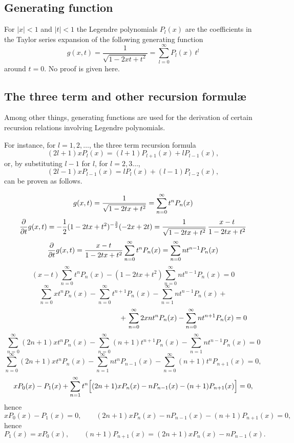 \subsection{Generating function}

For
$\vert x\vert<1$ and
$\vert t\vert<1$ the
Legendre polynomials $P_l(x)$ are the coefficients in the Taylor series expansion of the following generating function
\begin{equation}
g(x,t) =\frac{1}{\sqrt{1-2xt+t^2}}=\sum_{l=0}^\infty P_l(x)\, t^l
\end{equation}
 around $t=0$.
No proof is given here.

\subsection{The three term and other recursion formul\ae}

Among other things, generating functions are used for the derivation of certain recursion relations involving Legendre polynomials.

For instance, for $l=1,2,\ldots$, the   three term recursion formula
\begin{equation}
(2l+1)x P_l(x) = (l+1) P_{l+1}(x)+lP_{l-1}(x) ,
\end{equation}
or, by substituting $l-1$ for $l$,  for $l=2,3\ldots$,
\begin{equation}
(2l-1)x P_{l-1}(x) = l P_{l}(x)+(l-1)P_{l-2}(x),
\end{equation}
can be proven as follows.

{\color{OliveGreen}
\bproof

$$
   g(x,t)={1\over\sqrt{1-2tx+t^2}}=\sum_{n=0}^\infty t^nP_n(x)
$$
$$
   {\partial\over\partial t}g(x,t)=-{1\over 2}(1-2tx+t^2)^{-{3\over 2}}
   (-2x+2t)={1\over\sqrt{1-2tx+t^2}}\,{x-t\over1-2tx+t^2}
$$
$$
   {\partial\over\partial t}g(x,t)={x-t\over1-2tx+t^2}
   \sum_{n=0}^\infty t^nP_n(x)=\sum_{n=0}^\infty nt^{n-1}P_n(x)
$$
$$
   (x-t)\sum_{n=0}^\infty t^nP_n(x)-(1-2tx+t^2)
   \sum_{n=0}^\infty nt^{n-1}P_n(x)=0
$$
$$
   \sum_{n=0}^\infty xt^nP_n(x)-
   \sum_{n=0}^\infty t^{n+1}P_n(x)-
   \sum_{n=1}^\infty nt^{n-1}P_n(x)+
$$
$$
   \hspace*{5cm}+\,\sum_{n=0}^\infty 2xnt^nP_n(x)-
   \sum_{n=0}^\infty nt^{n+1}P_n(x)=0
$$
$$
   \sum_{n=0}^\infty (2n+1)xt^nP_n(x)-
   \sum_{n=0}^\infty (n+1)t^{n+1}P_n(x)-
   \sum_{n=1}^\infty nt^{n-1}P_n(x)=0
$$
$$
   \sum_{n=0}^\infty (2n+1)xt^nP_n(x)-
   \sum_{n=1}^\infty nt^{n}P_{n-1}(x)-
   \sum_{n=0}^\infty (n+1)t^nP_{n+1}(x)=0,
$$
$$
   xP_0(x)-P_1(x)+\sum_{n=1}^\infty t^n\Bigl[(2n+1)xP_n(x)-nP_{n-1}(x)
   -(n+1)P_{n+1}(x)\Bigr]=0,
$$
hence
$$
    xP_0(x)-P_1(x)=0, \qquad (2n+1)xP_n(x)-nP_{n-1}(x)-
   (n+1)P_{n+1}(x)=0,
$$
hence
$$
  P_1(x)=xP_0(x), \qquad (n+1)P_{n+1}(x)=
   (2n+1)xP_n(x)-nP_{n-1}(x).
$$

\eproof
}


